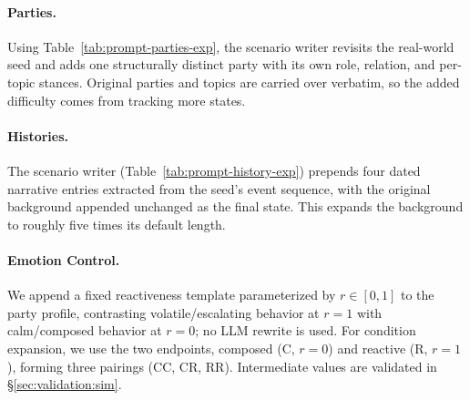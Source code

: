 \documentclass{llmxive}
\begin{document}
\paragraph{Parties.}
Using Table~\ref{tab:prompt-parties-exp}, the scenario writer revisits the real-world seed and adds one structurally distinct party with its own role, relation, and per-topic stances. Original parties and topics are carried over verbatim, so the added difficulty comes from tracking more states.

\paragraph{Histories.}
The scenario writer (Table~\ref{tab:prompt-history-exp}) prepends four dated narrative entries extracted from the seed's event sequence, with the original background appended unchanged as the final state. This expands the background to roughly five times its default length.

\paragraph{Emotion Control.}
We append a fixed reactiveness template parameterized by $r \in [0,1]$ to the party profile, contrasting volatile/escalating behavior at $r{=}1$ with calm/composed behavior at $r{=}0$; no LLM rewrite is used. For condition expansion, we use the two endpoints, composed (C, $r{=}0$) and reactive (R, $r{=}1$), forming three pairings (CC, CR, RR). Intermediate values are validated in \S\ref{sec:validation:sim}.
\end{document}
